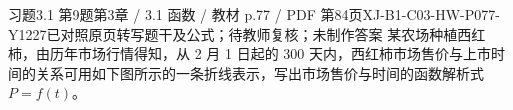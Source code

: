 \par\noindent\begin{minipage}{\linewidth}
\begin{bankitem}{习题3.1 第9题}{第3章 / 3.1 函数 / 教材 p.77 / PDF 第84页}{XJ-B1-C03-HW-P077-Y1227}{已对照原页转写题干及公式；待教师复核；未制作答案}
某农场种植西红柿，由历年市场行情得知，从 2 月 1 日起的 300 天内，西红柿市场售价与上市时间的关系可用如下图所示的一条折线表示，写出市场售价与时间的函数解析式 $P=f(t)$。
\end{bankitem}
\end{minipage}\par\medskip
